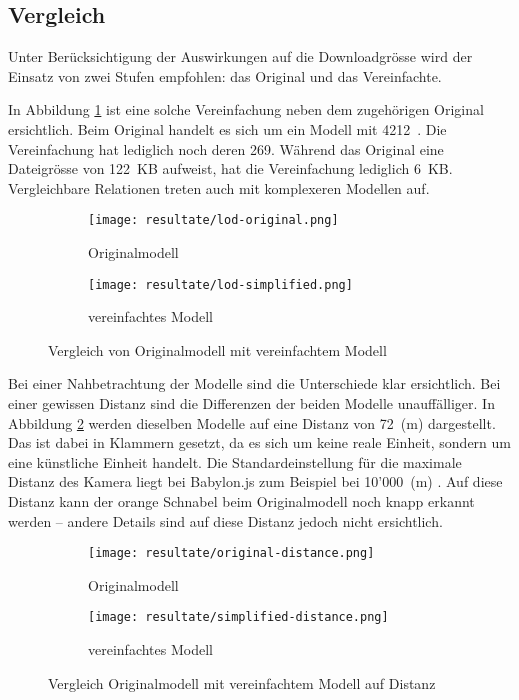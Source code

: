\subsection{Vergleich}

Unter Berücksichtigung der Auswirkungen auf die Downloadgrösse wird der Einsatz von zwei Stufen empfohlen: das Original und das Vereinfachte.

In Abbildung \ref{fig:lodComparison} ist eine solche Vereinfachung neben dem zugehörigen Original ersichtlich. Beim Original handelt es sich um ein Modell mit 4212 . Die Vereinfachung hat lediglich noch deren 269. Während das Original eine Dateigrösse von 122 KB aufweist, hat die Vereinfachung lediglich 6 KB. Vergleichbare Relationen treten auch mit komplexeren Modellen auf.

\begin{figure}[H]
  \centering
  \begin{subfigure}{.4\textwidth}
    \centering
    \texttt{[image: resultate/lod-original.png]}
    \caption{Originalmodell}
  \end{subfigure}
  \begin{subfigure}{.4\textwidth}
    \centering
    \texttt{[image: resultate/lod-simplified.png]}
    \caption{vereinfachtes Modell}
  \end{subfigure}
  \caption{Vergleich von Originalmodell mit vereinfachtem Modell}
  \label{fig:lodComparison}
\end{figure}

Bei einer Nahbetrachtung der Modelle sind die Unterschiede klar ersichtlich. Bei einer gewissen Distanz sind die Differenzen der beiden Modelle unauffälliger. In Abbildung \ref{fig:lodComparisonDistance} werden dieselben Modelle auf eine Distanz von 72 (m) dargestellt. Das  ist dabei in Klammern gesetzt, da es sich um keine reale Einheit, sondern um eine künstliche Einheit handelt. Die Standardeinstellung für die maximale Distanz des Kamera  liegt bei Babylon.js zum Beispiel bei 10'000 (m) \cite{babylonMaxZ}. Auf diese Distanz kann der orange Schnabel beim Originalmodell noch knapp erkannt werden – andere Details sind auf diese Distanz jedoch nicht ersichtlich.

\begin{figure}[H]
  \centering
  \begin{subfigure}{.4\textwidth}
    \centering
    \texttt{[image: resultate/original-distance.png]}
    \caption{Originalmodell}
  \end{subfigure}
  \begin{subfigure}{.4\textwidth}
    \centering
    \texttt{[image: resultate/simplified-distance.png]}
    \caption{vereinfachtes Modell}
  \end{subfigure}
  \caption{Vergleich Originalmodell mit vereinfachtem Modell auf Distanz}
  \label{fig:lodComparisonDistance}
\end{figure}


